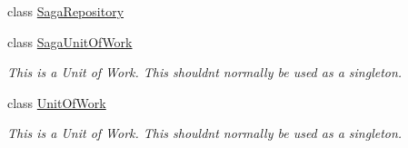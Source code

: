 \begin{DoxyCompactItemize}
\item 
class \hyperlink{classCqrs_1_1Domain_1_1SagaRepository}{Saga\+Repository}
\item 
class \hyperlink{classCqrs_1_1Domain_1_1SagaUnitOfWork}{Saga\+Unit\+Of\+Work}
\begin{DoxyCompactList}\small\item\em This is a Unit of Work. This shouldn\textquotesingle{}t normally be used as a singleton. \end{DoxyCompactList}\item 
class \hyperlink{classCqrs_1_1Domain_1_1UnitOfWork}{Unit\+Of\+Work}
\begin{DoxyCompactList}\small\item\em This is a Unit of Work. This shouldn\textquotesingle{}t normally be used as a singleton. \end{DoxyCompactList}\end{DoxyCompactItemize}

